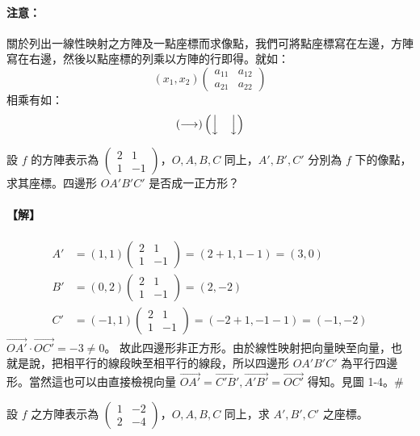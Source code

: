 \paragraph{注意：}關於列出一線性映射之方陣及一點座標而求像點，我們可將點座標寫在左邊，方陣寫在右邊，然後以點座標的列乘以方陣的行即得。就如：
\[ (x_1, x_2) \begin{pmatrix} a_{11} & a_{12} \\ a_{21} & a_{22} \end{pmatrix} \]
相乘有如：
\[ (\longrightarrow) \begin{pmatrix} \Big\downarrow & \Big\downarrow \end{pmatrix} \]

\begin{example}\label{ex:b6-1-8}
設 $f$ 的方陣表示為 $\begin{pmatrix} 2 & 1 \\ 1 & -1 \end{pmatrix}$，$O, A, B, C$ 同上，$A', B', C'$ 分別為 $f$ 下的像點，求其座標。四邊形 $OA'B'C'$ 是否成一正方形？
\end{example}

\paragraph{【解】}
\begin{align*}
A' &= (1, 1) \begin{pmatrix} 2 & 1 \\ 1 & -1 \end{pmatrix} = (2+1, 1-1) = (3, 0) \\
B' &= (0, 2) \begin{pmatrix} 2 & 1 \\ 1 & -1 \end{pmatrix} = (2, -2) \\
C' &= (-1, 1) \begin{pmatrix} 2 & 1 \\ 1 & -1 \end{pmatrix} = (-2+1, -1-1) = (-1, -2)
\end{align*}
$\vec{OA'} \cdot \vec{OC'} = -3 \ne 0$。
故此四邊形非正方形。由於線性映射把向量映至向量，也就是說，把相平行的線段映至相平行的線段，所以四邊形 $OA'B'C'$ 為平行四邊形。當然這也可以由直接檢視向量 $\vec{OA'}=\vec{C'B'}, \vec{A'B'}=\vec{OC'}$ 得知。見圖 1-4。\hfill$\#$

\begin{example}\label{ex:b6-1-9}
設 $f$ 之方陣表示為 $\begin{pmatrix} 1 & -2 \\ 2 & -4 \end{pmatrix}$，$O, A, B, C$ 同上，求 $A', B', C'$ 之座標。
\end{example}

